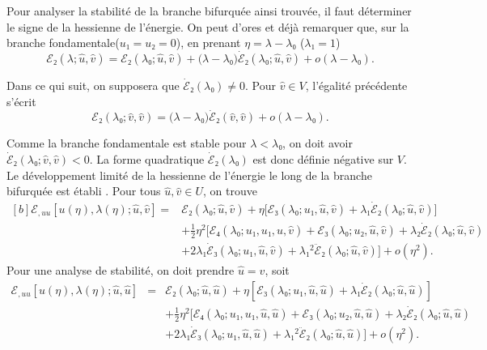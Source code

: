 \documentclass[12pt, final]{amsart}
\theoremstyle{definition}
\begin{document}
Pour analyser la stabilité de la branche bifurquée ainsi trouvée, il faut
déterminer le signe de la hessienne de l'énergie. On peut d'ores et déjà
remarquer que, sur la branche fondamentale(\(u₁ = u₂ = 0\)), en prenant
\(η = λ - λ₀\) (\(λ₁ = 1\))
\begin{equation}
 ℰ₂(λ; \hat{u}, \hat{v}) = ℰ₂(λ₀; \hat{u}, \hat{v}) + \bigl(λ - λ₀\bigr) \dot{ℰ}₂(λ₀; \hat{u}, \hat{v}) + o(λ - λ₀).
\end{equation}

Dans ce qui suit, on supposera que \(\dot{ℰ}₂(λ₀) ≠ 0\). Pour \(\hat{v}∈V\),
l'égalité précédente s'écrit
\begin{equation}
 ℰ₂(λ₀; \hat{v}, \hat{v}) = \bigl(λ - λ₀\bigr)\dot{ℰ}₂(\hat{v}, \hat{v}) + o(λ - λ₀).
\end{equation}

Comme la branche fondamentale est stable pour \(λ < λ₀\), on doit avoir
\(\dot{ℰ}₂(λ₀ ; \hat{v}, \hat{v}) < 0\). La forme quadratique \(\dot{ℰ}₂(λ₀)\)
est donc définie négative sur \(V\). Le développement limité de la hessienne de
l'énergie le long de la branche bifurquée est établi . Pour tous \(\hat{u}, \hat{v}∈U\), on trouve
\begin{equation}
  \label{eq:DL hessienne}
  \begin{aligned}[b]
    ℰ_{, u u}[u(η), λ(η); \hat{u}, \hat{v}]
    ={} & ℰ₂(λ₀ ; \hat{u}, \hat{v}) + η \bigl[ℰ₃(λ₀ ; u₁, \hat{u}, \hat{v})  + λ₁ \dot{ℰ}₂(λ₀; \hat{u}, \hat{v})\bigr]\\
    & + \tfrac{1}{2} η^2 \bigl[ℰ₄(λ₀; u₁, u₁, \hat{u}, \hat{v}) + ℰ₃(λ₀; u₂, \hat{u}, \hat{v}) + λ₂ \dot{ℰ}₂(λ₀; \hat{u}, \hat{v})\\
    & + 2 λ₁ \dot{ℰ}₃(λ₀; u₁, \hat{u}, \hat{v}) + λ₁^2 \ddot{ℰ}₂(λ₀; \hat{u}, \hat{v}) \bigr] + o(η^2).
  \end{aligned}
\end{equation}
Pour une analyse de stabilité, on doit prendre \(\hat{u} = \hat{v}\), soit
\begin{eqnarray}
 ℰ_{, u u} [u(η), λ(η) ; \hat{u}, \hat{u}] &
 = & ℰ₂(λ₀ ; \hat{u}, \hat{u}) + η [ℰ₃
 (λ₀ ; u₁, \hat{u}, \hat{u}) + λ₁ \dot{ℰ}₂
 (λ₀ ; \hat{u}, \hat{u})] \nonumber\\
 & & + \tfrac{1}{2} η^2 [ℰ₄(λ₀ ; u₁, u₁, \hat{u},
 \hat{u}) +ℰ₃(λ₀ ; u₂, \hat{u}, \hat{u}) + λ₂
 \dot{ℰ}₂(λ₀ ; \hat{u}, \hat{u}) \nonumber\\
 & & + 2 λ₁ \dot{ℰ}₃(λ₀ ; u₁,
 \hat{u}, \hat{u}) + λ₁^2 \ddot{ℰ}₂(λ₀ ; \hat{u},
 \hat{u})] + o(η^2) . \label{eq:DL hessienne diag}
\end{eqnarray}
\end{document}
